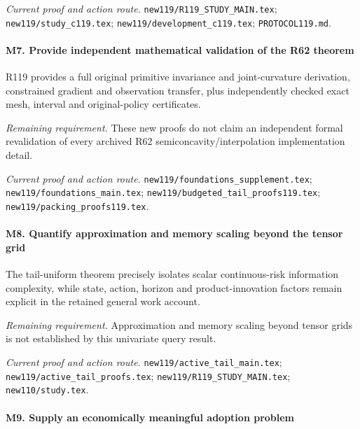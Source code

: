 \par\emph{Current proof and action route.} \nolinkurl{new119/R119_STUDY_MAIN.tex}; \nolinkurl{new119/study_c119.tex}; \nolinkurl{new119/development_c119.tex}; \nolinkurl{PROTOCOL119.md}.

\paragraph{M7. Provide independent mathematical validation of the R62 theorem}

R119 provides a full original primitive invariance and joint-curvature derivation, constrained gradient and observation transfer, plus independently checked exact mesh, interval and original-policy certificates.

\par\emph{Remaining requirement.} These new proofs do not claim an independent formal revalidation of every archived R62 semiconcavity/\allowbreak{}interpolation implementation detail.

\par\emph{Current proof and action route.} \nolinkurl{new119/foundations_supplement.tex}; \nolinkurl{new119/foundations_main.tex}; \nolinkurl{new119/budgeted_tail_proofs119.tex}; \nolinkurl{new119/packing_proofs119.tex}.

\paragraph{M8. Quantify approximation and memory scaling beyond the tensor grid}

The tail-uniform theorem precisely isolates scalar continuous-risk information complexity, while state, action, horizon and product-innovation factors remain explicit in the retained general work account.

\par\emph{Remaining requirement.} Approximation and memory scaling beyond tensor grids is not established by this univariate query result.

\par\emph{Current proof and action route.} \nolinkurl{new119/active_tail_main.tex}; \nolinkurl{new119/active_tail_proofs.tex}; \nolinkurl{new119/R119_STUDY_MAIN.tex}; \nolinkurl{new110/study.tex}.

\paragraph{M9. Supply an economically meaningful adoption problem}

